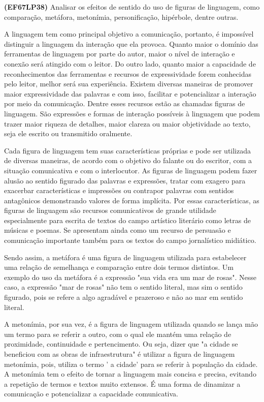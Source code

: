 {\textbf{(EF67LP38)} Analisar os efeitos de sentido do uso de figuras de
linguagem, como comparação, metáfora, metonímia, personificação,
hipérbole, dentre outras.

A linguagem tem como principal objetivo a comunicação, portanto, é
impossível distinguir a linguagem da interação que ela provoca. Quanto
maior o domínio das ferramentas de linguagem por parte do autor, maior o
nível de interação e conexão será atingido com o leitor. Do outro lado,
quanto maior a capacidade de reconhecimentos das ferramentas e recursos
de expressividade forem conhecidas pelo leitor, melhor será sua
experiência. Existem diversas maneiras de promover maior expressividade
das palavras e com isso, facilitar e potencializar a interação por meio
da comunicação. Dentre esses recursos estão as chamadas figuras de
linguagem. São expressões e formas de interação possíveis à linguagem
que podem trazer maior riqueza de detalhes, maior clareza ou maior
objetividade ao texto, seja ele escrito ou transmitido oralmente.

Cada figura de linguagem tem suas características próprias e pode ser
utilizada de diversas maneiras, de acordo com o objetivo do falante ou
do escritor, com a situação comunicativa e com o interlocutor. As
figuras de linguagem podem fazer alusão ao sentido figurado das palavras
e expressões, tratar com exagero para exacerbar características e
impressões ou contrapor palavras com sentidos antagônicos demonstrando
valores de forma implícita. Por essas características, as figuras de
linguagem são recursos comunicativos de grande utilidade especialmente
para escrita de textos do campo artístico literário como letras de
músicas e poemas. Se apresentam ainda como um recurso de persuasão e
comunicação importante também para os textos do campo jornalístico
midiático.

Sendo assim, a metáfora é uma figura de linguagem utilizada para
estabelecer uma relação de semelhança e comparação entre dois termos
distintos. Um exemplo do uso da metáfora é a expressão "sua vida era um
mar de rosas". Nesse caso, a expressão "mar de rosas" não tem o sentido
literal, mas sim o sentido figurado, pois se refere a algo agradável e
prazeroso e não ao mar em sentido literal.

A metonímia, por sua vez, é a figura de linguagem utilizada quando se
lança mão um termo para se referir a outro, com o qual ele mantém uma
relação de proximidade, continuidade e pertencimento. Ou seja, dizer que
"a cidade se beneficiou com as obras de infraestrutura" é utilizar a
figura de linguagem metonímia, pois, utiliza o termo ' a cidade' para se
referir à população da cidade. A metonímia tem o efeito de tornar a
linguagem mais concisa e precisa, evitando a repetição de termos e
textos muito extensos. É uma forma de dinamizar a comunicação e
potencializar a capacidade comunicativa.

}
